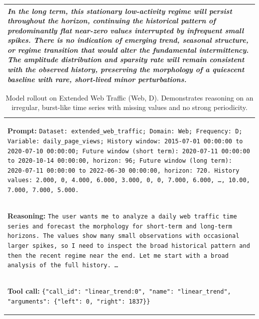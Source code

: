 \documentclass[11pt]{article}
\begin{document}
\begin{table}[t]
\begin{tabular}{p{}}
{{\textit{In the long term, this stationary low-activity regime will persist
throughout the horizon, continuing the historical pattern of predominantly flat
near-zero values interrupted by infrequent small spikes. There is no indication
of emerging trend, seasonal structure, or regime transition that would alter the
fundamental intermittency. The amplitude distribution and sparsity rate will
remain consistent with the observed history, preserving the morphology of a
quiescent baseline with rare, short-lived minor perturbations.}
}} \\

\bottomrule
\end{tabular}
\end{table}

\begin{table}[t]
\caption{Model rollout on Extended Web Traffic (Web, D). Demonstrates reasoning on an irregular, burst-like time series with missing values and no strong periodicity.}
\label{tab:tstar_web_success_case}
\centering
\small
\begin{tabular}{p{}}
\toprule
\colorbox{gray!10}{\parbox{0.95\textwidth}{%
\textbf{Prompt:}
\texttt{Dataset: extended\_web\_traffic; Domain: Web;
Frequency: D; Variable: daily\_page\_views; History window: 2015-07-01
00:00:00 to 2020-07-10 00:00:00; Future window (short term): 2020-07-11
00:00:00 to 2020-10-14 00:00:00, horizon: 96; Future window (long term):
2020-07-11 00:00:00 to 2022-06-30 00:00:00, horizon: 720. History values:
2.000, 0, 4.000, 6.000, 3.000, 0, 0, 7.000, 6.000, \ldots, 10.00,
7.000, 7.000, 5.000.}
}} \\

\hdashline

\colorbox{green!10}{\parbox{0.95\textwidth}{%
\textbf{Reasoning:}
\texttt{The user wants me to analyze a daily web traffic time series and
forecast the morphology for short-term and long-term horizons. The values show
many small observations with occasional larger spikes, so I need to inspect the
broad historical pattern and then the recent regime near the end. Let me start
with a broad analysis of the full history. \ldots}
}} \\

\hdashline

\colorbox{red!10}{\parbox{0.95\textwidth}{%
\textbf{Tool call:}
\texttt{\{"call\_id": "linear\_trend:0", "name": "linear\_trend",
"arguments": \{"left": 0, "right": 1837\}\}}
}} \\


\end{tabular}
\end{table}
\end{document}
